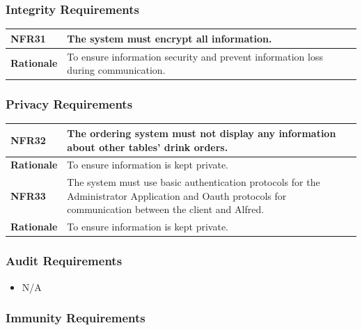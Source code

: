 \documentclass [11pt]{article}
\begin{document}
\subsubsection{Integrity Requirements }

\begin{longtable}{| p{ } | p{ } | }\hline 
\rowcolor{tableCell}\textbf{NFR31} & The system must encrypt all information.\\ \hline
\textbf{Rationale} &  To ensure information security and prevent information loss during communication.\\ \hline
\end{longtable}

\subsubsection{Privacy Requirements }

\begin{longtable}{| p{ } | p{ } | }\hline 
\rowcolor{tableCell}\textbf{NFR32} & The ordering system must not display any information about other tables' drink orders.\\ \hline
\textbf{Rationale} &  To ensure information is kept private.\\ \hline 

\rowcolor{tableCell}\textbf{NFR33} & The system must use basic authentication protocols for the Administrator Application and Oauth protocols for communication between the client and Alfred. \\ \hline
\textbf{Rationale} &  To ensure information is kept private.\\ \hline 
\end{longtable}

\subsubsection{Audit  Requirements}
	
	\begin{itemize}
		\item N/A
	\end{itemize} 

\subsubsection{Immunity Requirements}
\end{document}
